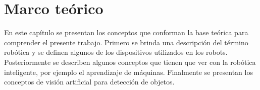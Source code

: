 \chapter{Marco teórico} \label{chap:marco_teorico}
\vspace{5 mm}
En este capítulo se presentan los conceptos que conforman la base teórica para comprender el presente trabajo. Primero se brinda una descripción del término robótica y se definen algunos de los dispositivos utilizados en los robots. Posteriormente se describen algunos conceptos que tienen que ver con la robótica inteligente, por ejemplo el aprendizaje de máquinas. Finalmente se presentan los conceptos de visión artificial para detección de objetos.
